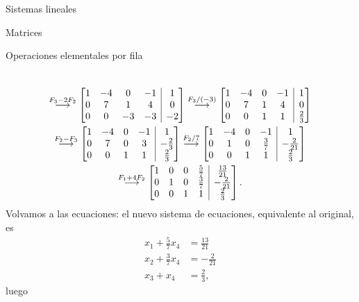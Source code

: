 \begin{chapter}{Sistemas lineales}
\begin{section}{Matrices}
\begin{subsection}{Operaciones elementales por fila}
\begin{ejemplo*}
\begin{multline*}
                    \\
                    \stackrel{F_3-2 F_2}{\longrightarrow} 
                    \left[\begin{array}{@{}*{4}{c}|c@{}}  1&-4 &0&-1&1 \\ 0& 7&1& 4&0 \\ 0&0&-3&-3&-2 \end{array}\right]  
                    \stackrel{F_3/(-3)}{\longrightarrow} 
                    \left[\begin{array}{@{}*{4}{c}|c@{}}  1&-4 &0&-1&1 \\ 0& 7&1& 4&0 \\ 0&0&1&1&\frac{2}{3} \end{array}\right]
                    \\
                    \stackrel{F_2- F_3}{\longrightarrow} 
                    \left[\begin{array}{@{}*{4}{c}|c@{}}  1&-4 &0&-1&1 \\ 0& 7&0& 3&-\frac{2}{3} \\ 0&0&1&1&\frac{2}{3} \end{array}\right]
                    \stackrel{F_2/7}{\longrightarrow} 
                    \left[\begin{array}{@{}*{4}{c}|c@{}}  1&-4 &0&-1&1\\ 0& 1&0& \frac37&-\frac{2}{21}\\ 0&0&1&1&\frac{2}{3}\end{array}\right]
                    \\
                    \stackrel{F_1 +4F_2}{\longrightarrow} 
                    \left[\begin{array}{@{}*{4}{c}|c@{}} 1&0&0&\frac{5}{7}&\frac{13}{21}\\0&1&0&\frac37&-\frac{2}{21} \\ 0&0&1&1&\frac{2}{3}\end{array}\right].
                    \end{multline*}
                    Volvamos a las ecuaciones: el nuevo sistema de ecuaciones, equivalente al original, es
                    \begin{align*}
                    x_1 +\frac{5}{7}x_4 &= \frac{13}{21} \\
                    x_2 + \frac{3}{7}x_4 &=-\frac{2}{21} \\
                    x_3 +x_4 &= \frac{2}{3}, 
                    \end{align*}
                    luego 
                    \begin{align*}

\end{align*}
\end{ejemplo*}
\end{subsection}
\end{section}
\end{chapter}
